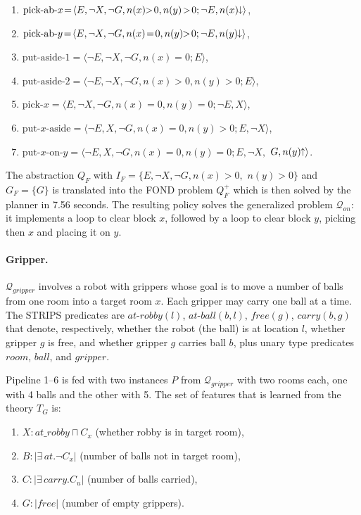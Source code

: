 \documentclass[letterpaper]{article} %
\newcommand{\tup}[1]{\langle #1 \rangle}
\newcommand{\abs}[1]{\ensuremath{\left\vert{#1}\right\vert}}
\newcommand{\Q}{\mathcal{Q}}
\newcommand{\abst}[2]{\tup{#1;#2}}
\newcommand{\pplus}{\hspace{-.05em}\raisebox{.15ex}{\footnotesize$\uparrow$}}
\newcommand{\mminus}{\hspace{-.05em}\raisebox{.15ex}{\footnotesize$\downarrow$}}
\begin{document}
\begin{enumerate}[--]
  \item $\text{pick-ab-$x$}\!=\!\abst{E,\neg X,\neg G,n(x)\!\!>\!0,n(y)\!>\!0}{\neg E,n(x)\mminus}$,
  \item $\text{pick-ab-$y$}\!=\!\abst{E,\neg X,\neg G,n(x)\!=\!0,n(y)\!\!>\!0}{\neg E,n(y)\mminus}$,
  \item $\text{put-aside-1}=\abst{\neg E,\neg X,\neg G,n(x)=0}{E}$,
  \item $\text{put-aside-2}=\abst{\neg E,\neg X,\neg G,n(x)>0,n(y)>0}{E}$,
  \item $\text{pick-$x$}=\abst{E,\neg X,\neg G,n(x)=0,n(y)=0}{\neg E,X}$,
  \item $\text{put-$x$-aside}\!=\!\abst{\neg E,X,\neg G,n(x)=0,n(y)>0}{E,\neg X}$,
  \item $\text{put-$x$-on-$y$} = \langle \neg E, X, \neg G, n(x)=0, n(y)=0; E, \neg X,$ $G, n(y)\pplus \rangle$.
\end{enumerate}

The abstraction $Q_F$  with $I_F=\{E,\neg X,\neg G,n(x)>0,$ $n(y)\!>\!0\}$
and $G_F = \{G\}$ is translated into the FOND problem $Q_F^+$
which is then solved by the planner in 7.56 seconds.
The resulting policy solves the generalized problem $\Q_{on}$:
it implements a loop to clear block $x$, followed by a loop
to clear block $y$, picking then $x$ and placing it on $y$.


\paragraph{Gripper.}
$\Q_{gripper}$ involves  a robot with grippers whose goal
is to move a number of balls from one room into a target
room $x$. Each gripper may carry one ball at a time.
The STRIPS predicates are $at\text{-}robby(l)$, $at\text{-}ball(b,l)$,
$free(g)$, $carry(b,g)$ that denote, respectively, whether the robot
(the ball) is at location $l$, whether gripper $g$ is free, and whether
gripper $g$ carries ball $b$, plus unary type predicates $room$, $ball$,
and $gripper$. %

Pipeline 1--6 is fed with two instances $P$ from $\Q_{gripper}$  with two
rooms each, one with 4 balls and the other with 5. The set of features that
is learned  from the theory $T_G$ is:
\begin{enumerate}[--]
  \item $X: at\_robby \sqcap C_x$ (whether robby is in target room),
  \item $B: |\exists\,at . \neg C_x|$ (number of balls not in target room),
  \item $C: |\exists\,carry . C_u|$ (number of balls carried),
  \item $G: \abs{free}$ (number of empty grippers).
\end{enumerate}
\end{document}
